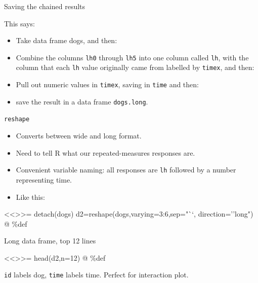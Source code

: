 \documentclass[ignorenonframetext,]{beamer}
\newenvironment{Shaded}{\begin{snugshade}}{\end{snugshade}}
\newcommand{\DataTypeTok}[1]{\textcolor[rgb]{0.13,0.29,0.53}{#1}}
\newcommand{\KeywordTok}[1]{\textcolor[rgb]{0.13,0.29,0.53}{\textbf{#1}}}
\newcommand{\NormalTok}[1]{#1}
\newcommand{\OperatorTok}[1]{\textcolor[rgb]{0.81,0.36,0.00}{\textbf{#1}}}
\newcommand{\StringTok}[1]{\textcolor[rgb]{0.31,0.60,0.02}{#1}}
\begin{document}
\begin{frame}[fragile]{Saving the chained results}
\protect\hypertarget{saving-the-chained-results}{}

\begin{Shaded}
\end{Shaded}

This says:

\begin{itemize}
\item
  Take data frame dogs, and then:
\item
  Combine the columns \texttt{lh0} through \texttt{lh5} into one column
  called \texttt{lh}, with the column that each \texttt{lh} value
  originally came from labelled by \texttt{timex}, and then:
\item
  Pull out numeric values in \texttt{timex}, saving in \texttt{time} and
  then:
\item
  save the result in a data frame \texttt{dogs.long}.
\end{itemize}

\end{frame}

\begin{frame}[fragile]{\texttt{reshape}}
\protect\hypertarget{reshape}{}

\begin{itemize}
\item
  Converts between wide and long format.
\item
  Need to tell R what our repeated-measures responses are.
\item
  Convenient variable naming: all responses are \texttt{lh} followed by
  a number representing time.
\item
  Like this:
\end{itemize}

\textless{}\textless{}\textgreater{}\textgreater{}= detach(dogs)
d2=reshape(dogs,varying=3:6,sep="``, direction=''long") @ \%def

\end{frame}

\begin{frame}[fragile]{Long data frame, top 12 lines}
\protect\hypertarget{long-data-frame-top-12-lines}{}

\textless{}\textless{}\textgreater{}\textgreater{}= head(d2,n=12) @
\%def

\texttt{id} labels dog, \texttt{time} labels time. Perfect for
interaction plot.

\end{frame}
\end{document}
